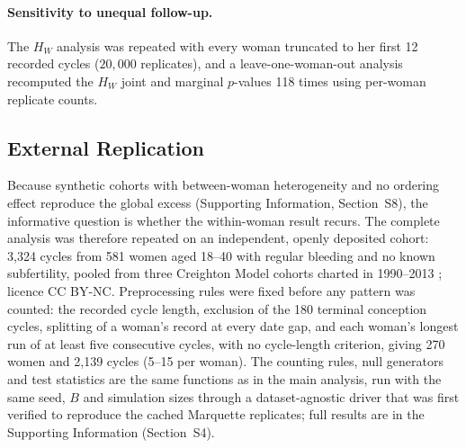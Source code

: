 \documentclass[12pt]{article}
\newcommand{\HW}{H_{W}}
\begin{document}
\paragraph{Sensitivity to unequal follow-up.} The $\HW$ analysis was repeated with every
woman truncated to her first 12 recorded cycles ($20{,}000$ replicates), and a
leave-one-woman-out analysis recomputed the $\HW$ joint and marginal $p$-values 118 times
using per-woman replicate counts.

\subsection{External Replication}
\label{sec:extmethods}

Because synthetic cohorts with between-woman heterogeneity and no ordering effect
reproduce the global excess (Supporting Information, Section~S8), the informative question
is whether the within-woman result recurs. The complete analysis was therefore repeated on an independent, openly deposited cohort: 3,324 cycles
from 581 women aged 18--40 with regular bleeding and no known subfertility, pooled from
three Creighton Model cohorts charted in 1990--2013 \citep{stanford2023data,najmabadi2020};
licence CC BY-NC. Preprocessing rules were fixed before any pattern was counted: the
recorded cycle length, exclusion of the 180 terminal conception cycles, splitting of a
woman's record at every date gap, and each woman's longest run of at least five
consecutive cycles, with no cycle-length criterion, giving 270 women and 2,139 cycles
(5--15 per woman). The counting rules, null generators and test statistics are the same
functions as in the main analysis, run with the same seed, $B$ and simulation sizes
through a dataset-agnostic driver that was first verified to reproduce the cached
Marquette replicates; full results are in the Supporting Information (Section~S4).
\end{document}
